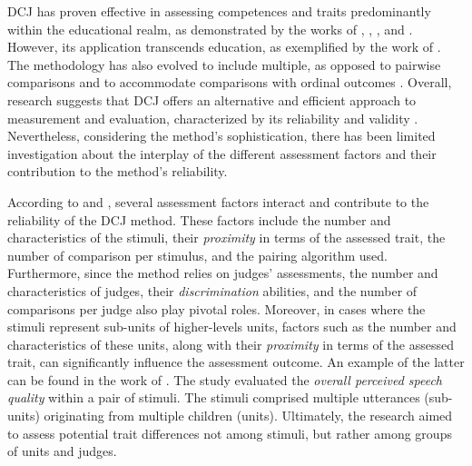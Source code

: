 \documentclass[
  authoryear,
  preprint,
  1p]{elsarticle}
\begin{document}
DCJ has proven effective in assessing competences and traits
predominantly within the educational realm, as demonstrated by the works
of \citet{Pollitt_2012b}, \citet{Bartholomew_et_al_2018},
\citet{vanDaal_et_al_2016} \citet{Lesterhuis_2018}, and
\citet{Bartholomew_et_al_2020}. However, its application transcends
education, as exemplified by the work of \citet{Boonen_et_al_2020}. The
methodology has also evolved to include multiple, as opposed to pairwise
comparisons \citep{Luce_1959, Placket_1975} and to accommodate
comparisons with ordinal outcomes \citep{Tutz_1986, Agresti_1992}.
Overall, research suggests that DCJ offers an alternative and efficient
approach to measurement and evaluation, characterized by its reliability
and validity \citep{Lesterhuis_2018, vanDaal_2020, Marshall_et_al_2020}.
Nevertheless, considering the method's sophistication, there has been
limited investigation about the interplay of the different assessment
factors and their contribution to the method's reliability.

According to \citet{Verhavert_et_al_2019} and \citet{vanDaal_2020},
several assessment factors interact and contribute to the reliability of
the DCJ method. These factors include the number and characteristics of
the stimuli, their \emph{proximity} in terms of the assessed trait, the
number of comparison per stimulus, and the pairing algorithm used.
Furthermore, since the method relies on judges' assessments, the number
and characteristics of judges, their \emph{discrimination} abilities,
and the number of comparisons per judge also play pivotal roles.
Moreover, in cases where the stimuli represent sub-units of
higher-levels units, factors such as the number and characteristics of
these units, along with their \emph{proximity} in terms of the assessed
trait, can significantly influence the assessment outcome. An example of
the latter can be found in the work of \citet{Boonen_et_al_2020}. The
study evaluated the \emph{overall perceived speech quality} within a
pair of stimuli. The stimuli comprised multiple utterances (sub-units)
originating from multiple children (units). Ultimately, the research
aimed to assess potential trait differences not among stimuli, but
rather among groups of units and judges.
\end{document}
